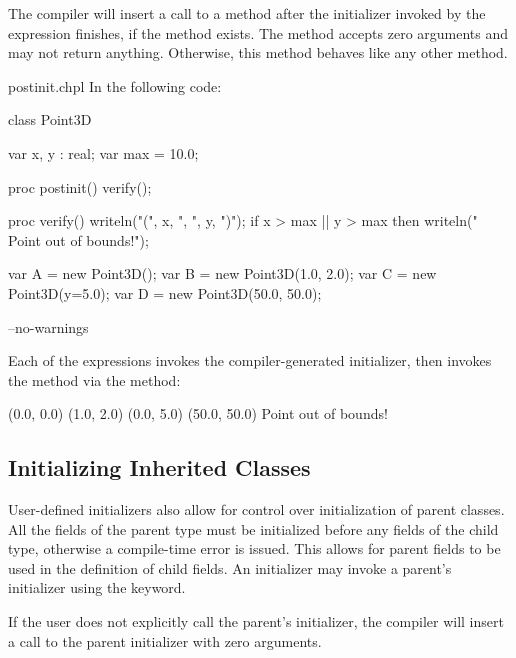 The compiler will insert a call to a  method after the
initializer invoked by the  expression finishes, if the method
exists. The  method accepts zero arguments and may not return
anything. Otherwise, this method behaves like any other method.

\begin{chapelexample}{postinit.chpl}
In the following code:
\begin{chapel}
class Point3D {
  var x, y : real;
  var max = 10.0;

  proc postinit() {
    verify();
  }

  proc verify() {
    writeln("(", x, ", ", y, ")");
    if x > max || y > max then
      writeln("  Point out of bounds!");
  }
}

var A = new Point3D();
var B = new Point3D(1.0, 2.0);
var C = new Point3D(y=5.0);
var D = new Point3D(50.0, 50.0);
\end{chapel}
\begin{chapelcompopts}
--no-warnings
\end{chapelcompopts}
Each of the  expressions invokes the compiler-generated initializer,
then invokes the  method via the  method:
\begin{chapelprintoutput}{}
(0.0, 0.0)
(1.0, 2.0)
(0.0, 5.0)
(50.0, 50.0)
  Point out of bounds!
\end{chapelprintoutput}
\end{chapelexample}

\subsection{Initializing Inherited Classes}
\label{Initializing_Inherited}

User-defined initializers also allow for control over initialization of parent
classes. All the fields of the parent type must be initialized before any
fields of the child type, otherwise a compile-time error is issued. This allows
for parent fields to be used in the definition of child fields. An initializer
may invoke a parent's initializer using the  keyword.

If the user does not explicitly call the parent's initializer, the compiler
will insert a call to the parent initializer with zero arguments.

